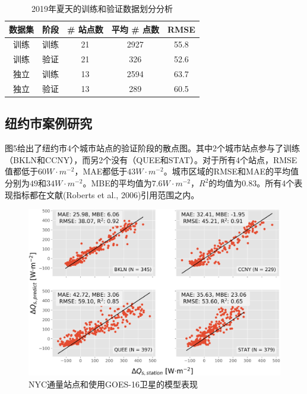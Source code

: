 \documentclass[3p,times]{elsarticle}
\begin{document}
\begin{table}[htbp]
    \caption{2019年夏天的训练和验证数据划分分析}
    \centering
    \begin{tabular}{ccccc}\hline
        数据集&阶段&\# 站点数&平均 \# 点数&RMSE\\
        \hline
        训练&训练&21&2927&55.8\\
        训练&验证&21&326&52.6\\
        独立&训练&13&2594&63.7\\
        独立&验证&13&289&60.5\\
        \hline
    \end{tabular}
    
\end{table}

\subsection{纽约市案例研究}

图5给出了纽约市4个城市站点的验证阶段的散点图。其中2个城市站点参与了训练（BKLN和CCNY），而另2个没有（QUEE和STAT）。对于所有4个站点，RMSE值都低于$60W\cdot m^{-2}$，MAE都低于$43W\cdot m^{-2}$。城市区域的RMSE和MAE的平均值分别为$49$和$34W\cdot m^{-2}$。MBE的平均值为$7.6W\cdot m^{-2}$，$R^2$的均值为$0.83$。所有4个表现指标都在文献(Roberts et al., 2006)引用范围之内。

\begin{figure}[htb]
    \begin{center}
        \includegraphics[width=\linewidth]{img/图5.png}
    \end{center}
    \caption{NYC通量站点和使用GOES-16卫星的模型表现}
\end{figure}
\end{document}
